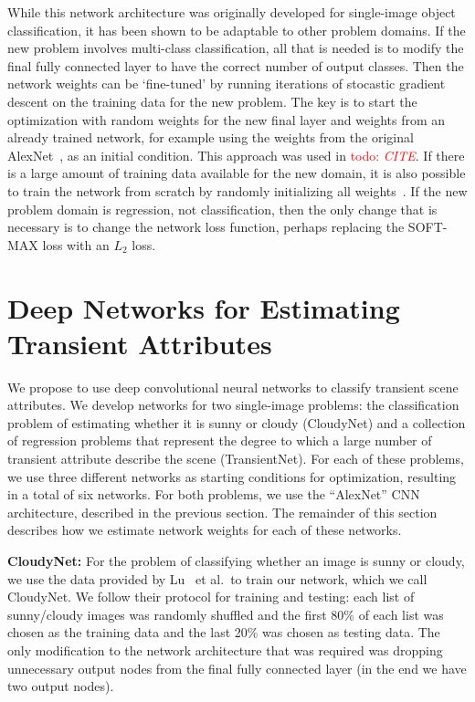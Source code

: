 \documentclass{article}
\newcommand{\todo}[1]{\textcolor{red}{todo: {\em #1}}}
\begin{document}
While this network architecture was originally developed for
single-image object classification, it has been shown to be adaptable
to other problem domains. If the new problem involves multi-class
classification, all that is needed is to modify the final fully
connected layer to have the correct number of output classes. Then the
network weights can be `fine-tuned' by running iterations of stocastic
gradient descent on the training data for the new problem.  The key is
to start the optimization with random weights for the new final layer
and weights from an already trained network, for example using the
weights from the original AlexNet~\cite{caffenetnips12}, as an initial
condition. This approach was used in \todo{CITE}. If there is a large
amount of training data available for the new domain, it is also
possible to train the network from scratch by randomly initializing
all weights~\cite{zhou2014places}.  If the new problem domain is
regression, not classification, then the only change that is necessary
is to change the network loss function, perhaps replacing the SOFT-MAX
loss with an $L_2$ loss.

\section{Deep Networks for Estimating Transient Attributes}

We propose to use deep convolutional neural networks to classify
transient scene attributes. We develop networks for two single-image
problems: the classification problem of estimating whether it is sunny
or cloudy (CloudyNet) and a collection of regression problems that
represent the degree to which a large number of transient attribute
describe the scene (TransientNet).  For each of these problems, we
use three different networks as starting conditions for optimization,
resulting in a total of six networks.  For both problems, we use the
``AlexNet'' CNN architecture, described in the previous section.  The
remainder of this section describes how we estimate network weights
for each of these networks.

\textbf{CloudyNet:} For the problem of classifying whether an image is
sunny or cloudy, we use the data provided by Lu~\cite{lutwoclass} et
al.\ to train our network, which we call CloudyNet.  We follow their
protocol for training and testing: each list of sunny/cloudy images
was randomly shuffled and the first 80\% of each list was chosen as
the training data and the last 20\% was chosen as testing data.  The
only modification to the network architecture that was required was
dropping unnecessary output nodes from the final fully connected layer
(in the end we have two output nodes).
\end{document}
